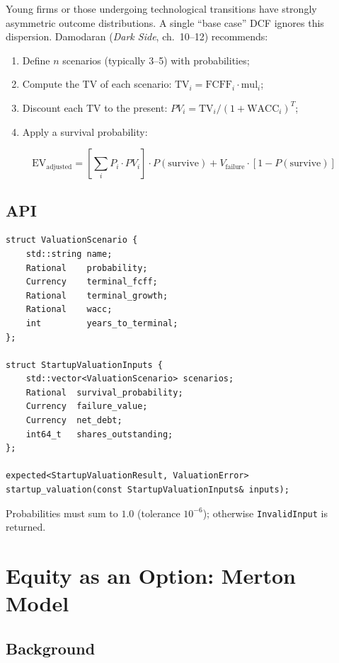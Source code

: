 \documentclass[12pt, a4paper, oneside]{book}
\newcommand{\FCFF}{\ensuremath{\mathrm{FCFF}}}
\newcommand{\WACC}{\ensuremath{\mathrm{WACC}}}
\newcommand{\EV}{\ensuremath{\mathrm{EV}}}
\newcommand{\TV}{\ensuremath{\mathrm{TV}}}
\begin{document}
Young firms or those undergoing technological transitions have strongly
asymmetric outcome distributions. A single ``base case'' DCF ignores this
dispersion. Damodaran (\textit{Dark Side}, ch.~10--12) recommends:

\begin{enumerate}
  \item Define $n$ scenarios (typically 3--5) with probabilities;
  \item Compute the TV of each scenario: $\TV_i = \FCFF_i \cdot \text{mul}_i$;
  \item Discount each TV to the present: $PV_i = \TV_i / (1+\WACC_i)^T$;
  \item Apply a survival probability:
\end{enumerate}

\begin{equation}
  \EV_{\text{adjusted}} = \left[\sum_i P_i \cdot PV_i \right]
                          \cdot P(\text{survive})
                        + V_{\text{failure}} \cdot [1 - P(\text{survive})]
\end{equation}

\subsection{API}

\begin{lstlisting}[style=cpp]
struct ValuationScenario {
    std::string name;
    Rational    probability;
    Currency    terminal_fcff;
    Rational    terminal_growth;
    Rational    wacc;
    int         years_to_terminal;
};

struct StartupValuationInputs {
    std::vector<ValuationScenario> scenarios;
    Rational  survival_probability;
    Currency  failure_value;
    Currency  net_debt;
    int64_t   shares_outstanding;
};

expected<StartupValuationResult, ValuationError>
startup_valuation(const StartupValuationInputs& inputs);
\end{lstlisting}

Probabilities must sum to $1.0$ (tolerance $10^{-6}$);
otherwise \texttt{InvalidInput} is returned.

\section{Equity as an Option: Merton Model}

\subsection{Background}
\end{document}
